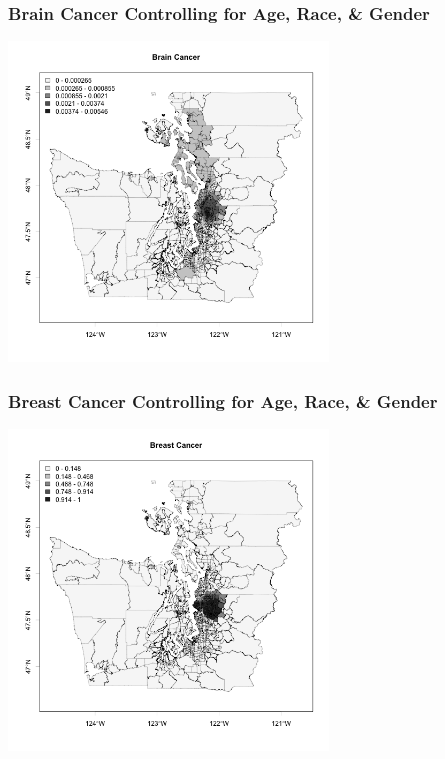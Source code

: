 \documentclass[slides]{beamer}
\begin{document}
\begin{frame}[fragile]
\frametitle{Brain Cancer Controlling for Age, Race, \& Gender}
\begin{center}
\includegraphics[width=8.5cm]{figure/brain.png}
\end{center}
\end{frame}


\begin{frame}[fragile]
\frametitle{Breast Cancer Controlling for Age, Race, \& Gender}
\begin{center}
\includegraphics[width=8.5cm]{figure/breast.png}
\end{center}
\end{frame}
\end{document}
